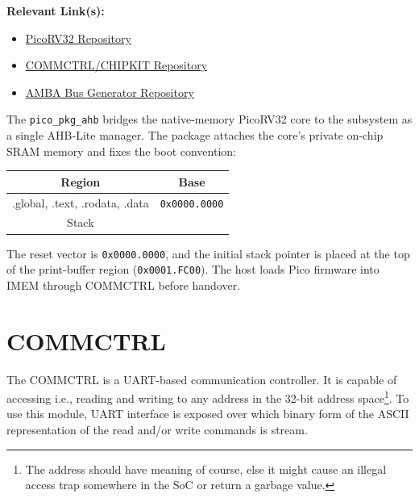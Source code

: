 \textbf{Relevant Link(s):} \begin{itemize}
  \item \href{https://github.com/YosysHQ/picorv32}{PicoRV32 Repository}
  \item \href{https://github.com/whatmough/CHIPKIT.git}{COMMCTRL/CHIPKIT Repository}
  \item \href{https://github.com/adki/gen_amba_2021.git}{AMBA Bus Generator Repository}
\end{itemize}

The \texttt{pico\_pkg\_ahb} bridges the native-memory PicoRV32 core to the subsystem as a single AHB-Lite manager. The package attaches the core's private on-chip SRAM memory and fixes the boot
convention:
\begin{center}
  \begin{tabular}{c c}
    \toprule
    \textbf{Region} & \textbf{Base} \\
    \midrule
    .global, .text, .rodata, .data & \texttt{0x0000.0000}\\
    Stack & \\
    \bottomrule
  \end{tabular}
\end{center}

The reset vector is \texttt{0x0000.0000}, and the initial stack pointer is placed at the top of the print-buffer region (\texttt{0x0001.FC00}). The host loads Pico firmware into IMEM through COMMCTRL before handover.

\section{COMMCTRL}\label{sec:sw-commctrl}

The COMMCTRL is a UART-based communication controller. It is capable of accessing i.e., reading and writing to any address in the 32-bit address space\footnote{The address should have meaning of course, else it might cause an illegal access trap somewhere in the SoC or return a garbage value.}. To use this module, UART interface is exposed over which binary form of the ASCII representation of the read and/or write commands is stream. 

